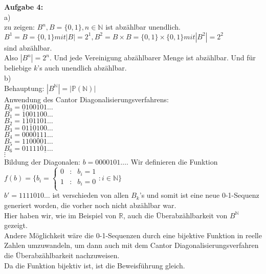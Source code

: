 \documentclass[a4paper]{scrartcl}
\begin{document}
	\begin{flushleft}
		\textbf{Aufgabe 4:}\\
		a)\\
		zu zeigen: $B^n, B=\{0,1\}, n\in \mathbb{N}$ ist abzählbar unendlich.\\[1em]
		$B^1 = B = \{0,1\} mit  |B| = 2^1, B^2 = B\times B = \{0,1\}\times \{0,1\} mit  |B^2| = 2^2$\\ sind abzählbar.\\
		Also $|B^n| = 2^n$. Und jede Vereinigung abzählbarer Menge ist abzählbar. Und für beliebige $k$'s auch unendlich abzählbar.\\ [1em]
		b)\\
		Behauptung:  $|B^{\mathbb{N}}| = |\mathbb{P}(\mathbb{N})|$\\
		Anwendung des Cantor Diagonalisierungsverfahrens:\\ 
		$B_0 = \underline{0}100101\dots$\\
		$B_1 = 1\underline{0}01100\dots$\\
		$B_2 = 11\underline{0}1101\dots$\\
		$B_3 = 011\underline{0}100\dots$\\
		$B_4 = 0000\underline{1}11\dots$\\
		$B_5 = 11000\underline{0}1\dots$\\
		$B_6 = 011110\underline{1}\dots$\\
		$\vdots$\\
		Bildung der Diagonalen: $b = 0000101\dots$. Wir definieren die Funktion $f(b) = \{b_i = \left\{ \begin{array}{rcl}
		         0 & \mbox{:} & b_i = 1 \\
		         1 & \mbox{:} & b_i = 0 \\
                \end{array}\right.  : i\in \mathbb{N}\}$\\
        $b' = 1111010\dots$ ist verschieden von allen $B_k$'s und somit ist eine neue 0-1-Sequenz generiert worden, die vorher noch nicht abzählbar war.\\
        Hier haben wir, wie im Beispiel von $\mathbb{R}$, auch die Überabzählbarkeit  von $B^{\mathbb{N}}$gezeigt.\\[1em]
        Andere Möglichkeit wäre die 0-1-Sequenzen durch eine bijektive Funktion in reelle Zahlen umzuwandeln, um dann auch mit dem Cantor Diagonalisierungsverfahren die Überabzählbarkeit nachzuweisen.\\
        Da die Funktion bijektiv ist, ist die Beweisführung gleich.\\
	\end{flushleft}
\end{document}
